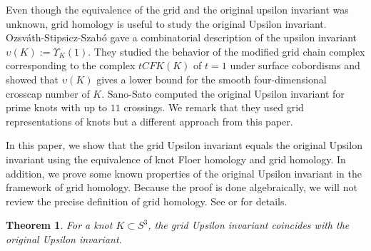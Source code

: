 \documentclass[12pt]{amsart}
\theoremstyle{plain}
\newtheorem{thm}{Theorem}[section]
\theoremstyle{definition}
\theoremstyle{plain}
\theoremstyle{definition}
\numberwithin{equation}{section}
\begin{document}
Even though the equivalence of the grid and the original upsilon invariant was unknown, grid homology is useful to study the original Upsilon invariant.
Ozsv\'{a}th-Stipsicz-Szab\'{o} \cite{Unoriented-knot-Floer-homology-and-the-unoriented-four-ball-genus} gave a combinatorial description of the upsilon invariant $\upsilon(K):=\Upsilon_K(1)$.
They studied the behavior of the modified grid chain complex corresponding to the complex $tCFK(K)$ of $t=1$ under surface cobordisms and showed that $\upsilon(K)$ gives a lower bound for the smooth four-dimensional crosscap number of $K$.
Sano-Sato \cite{An-algorithm-for-computing-the-Υ-invariant-and-the-d-invariants-of-Dehn-surgeries} computed the original Upsilon invariant for prime knots with up to $11$ crossings.
We remark that they used grid representations of knots but a different approach from this paper.


In this paper, we show that the grid Upsilon invariant equals the original Upsilon invariant using the equivalence of knot Floer homology and grid homology.
In addition, we prove some known properties of the original Upsilon invariant in the framework of grid homology.
Because the proof is done algebraically, we will not review the precise definition of grid homology.
See \cite{oncombinatorial} or \cite{Grid-homology-for-knots-and-links} for details.


\begin{thm}
\label{thm:Upsilon}
For a knot $K \subset S^3$, the grid Upsilon invariant coincides with the original Upsilon invariant.
\end{thm}
\end{document}
